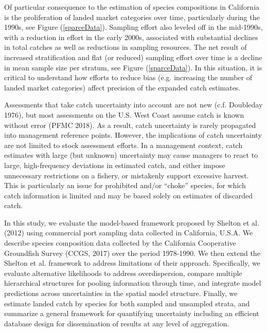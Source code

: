 \documentclass[12pt]{article}
\begin{document}
Of particular consequence to the estimation of species compositions in 
California is the proliferation of landed market categories over time, 
particularly during the 1990s, see Figure (\ref{sparceData}). Sampling effort 
also leveled off in the mid-1990s, with a reduction in effort in the early 
2000s, associated with substantial declines in total catches as well as 
reductions in sampling resources. The net result of increased stratification 
and flat (or reduced) sampling effort over time is a decline in mean sample 
size per stratum, see Figure (\ref{sparceData}). In this situation, it is 
critical to understand how efforts to reduce bias (e.g. increasing the number 
of landed market categories) affect precision of the expanded catch estimates.

Assessments that take catch uncertainty into account are not new (c.f.
Doubleday 1976), but most assessments on the U.S. West Coast assume
catch is known without error (PFMC 2018). As a result, catch uncertainty
is rarely propagated into management reference points. However, the
implications of catch uncertainty are not limited to stock assessment
efforts. In a management context, catch estimates with large (but
unknown) uncertainty may cause managers to react to large,
high-frequency deviations in estimated catch, and either impose
unnecessary restrictions on a fishery, or mistakenly support excessive
harvest. This is particularly an issue for prohibited and/or ``choke''
species, for which catch information is limited and may be based solely on
estimates of discarded catch.

In this study, we evaluate the model-based framework proposed by Shelton
et al. (2012) using commercial port sampling data collected in
California, U.S.A. We describe species composition data collected by the
California Cooperative Groundfish Survey (CCGS, 2017) over the period
1978-1990. We then extend the Shelton et al. framework to address
limitations of their approach. Specifically, we evaluate alternative
likelihoods to address overdispersion, compare multiple hierarchical
structures for pooling information through time, and integrate model
predictions across uncertainties in the spatial model structure.
Finally, we estimate landed catch by species for both sampled and
unsampled strata, and summarize a general framework for quantifying
uncertainty including an efficient database design for dissemination of
results at any level of aggregation.
\end{document}
